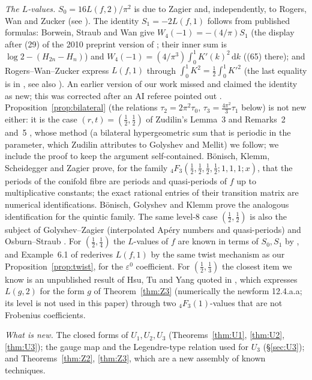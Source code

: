 \documentclass[11pt]{amsart}
\theoremstyle{definition}
\theoremstyle{remark}
\numberwithin{equation}{section}
\newcommand{\dd}{\,\mathrm{d}}
\begin{document}
\emph{The $L$-values.} $S_0=16L(f,2)/\pi^2$ is due to Zagier \cite{Zag7} and, independently, to Rogers, Wan and Zucker \cite[(30)]{RWZ} (see \cite[(4)]{Zud}). The identity $S_1=-2L(f,1)$ follows from published formulas: Borwein, Straub and Wan \cite{BSW} give $W_4(-1)=-(4/\pi)S_1$ (the display after (29) of the 2010 preprint version of \cite{BSW}; their inner sum is $\log2-(H_{2n}-H_n)$) and $W_4(-1)=(4/\pi^3)\int_0^1K'(k)^2\dd k$ ((65) there); and Rogers--Wan--Zucker \cite[(31)]{RWZ} express $L(f,1)$ through $\int_0^1K^2=\frac12\int_0^1K'^2$ (the last equality is in \cite{BSW}, see also \cite[(3)]{Wan}). An earlier version of our work missed \cite{BSW} and claimed the identity as new; this was corrected after an AI referee pointed out \cite{BSW}.
Proposition~\ref{prop:bilateral} (the relations $\tau_2=2\pi^2\tau_0$, $\tau_3=\frac{4\pi^2}{3}\tau_1$ below) is not new either: it is the case $(r,t)=(\frac12,\frac12)$ of Zudilin's Lemma~3 and Remarks~2 and~5 \cite{Zud}, whose method (a bilateral hypergeometric sum that is periodic in the parameter, which Zudilin attributes to Golyshev and Mellit) we follow; we include the proof to keep the argument self-contained.
Bönisch, Klemm, Scheidegger and Zagier \cite[\S4]{BKSZ} prove, for the family ${}_4F_3(\frac12,\frac12,\frac12,\frac12;1,1,1;x)$, that the periods of the conifold fibre are periods and quasi-periods of $f$ up to multiplicative constants; the exact rational entries of their transition matrix are numerical identifications. Bönisch, Golyshev and Klemm \cite{BGK} prove the analogous identification for the quintic family.
The same level-8 case $(\frac12,\frac12)$ is also the subject of Golyshev--Zagier \cite{GZ} (interpolated Ap\'ery numbers and quasi-periods) and Osburn--Straub \cite{OS}. For $(\frac12,\frac14)$ the $L$-values of $f$ are known in terms of $S_0,S_1$ by \cite[(30), (31)]{RWZ}, and Example~6.1 of \cite{EHMM3} rederives $L(f,1)$ by the same twist mechanism as our Proposition~\ref{prop:twist}, for the $\varepsilon^0$ coefficient. For $(\frac12,\frac13)$ the closest item we know is an unpublished result of Hsu, Tu and Yang quoted in \cite[Example~6.2]{EHMM3}, which expresses $L(g,2)$ for the form $g$ of Theorem~\ref{thm:Z3} (numerically the newform 12.4.a.a; its level is not used in this paper) through two ${}_4F_3(1)$-values that are not Frobenius coefficients.

\emph{What is new.} The closed forms of $U_1,U_2,U_3$ (Theorems~\ref{thm:U1}, \ref{thm:U2}, \ref{thm:U3}); the gauge map and the Legendre-type relation used for $U_3$ (\S\ref{sec:U3}); and Theorems~\ref{thm:Z2}, \ref{thm:Z3}, which are a new assembly of known techniques.
\end{document}
